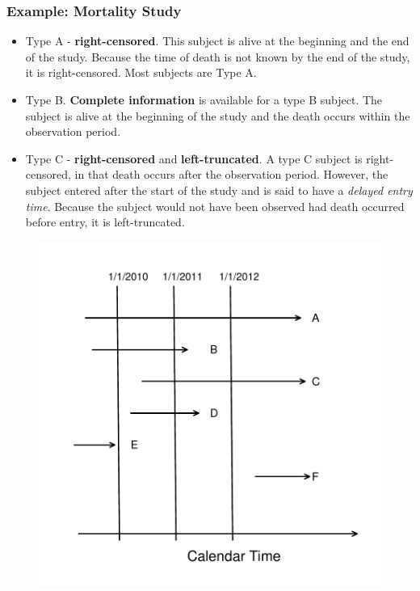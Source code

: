 \documentclass{beamer}
\begin{document}
\begin{frame}%
\frametitle{Example: Mortality Study}
\begin{itemize}
\item Type A - \textbf{right-censored}. This subject is alive at the beginning and the end of the study. Because the time of death is not known by the end of the study, it is right-censored. Most subjects are Type A.
\item Type B. \textbf{Complete information} is available for a type B subject. The subject is alive at the beginning of the study and the death occurs within the observation period.
\item Type C - \textbf{right-censored} and \textbf{left-truncated}. A type C subject is right-censored, in that death occurs after the observation period. However, the subject entered after the start of the study and is said to have a \emph{delayed entry time}. Because the subject would not have been observed had death occurred before entry, it is left-truncated.
\end{itemize}
\vspace{-.15in}
\begin{figure}[htp]
  \begin{center}
    \includegraphics[width=.45\textwidth]{Figures/F14Mortality.pdf}
  \end{center}
\end{figure}
\end{frame}
\end{document}
